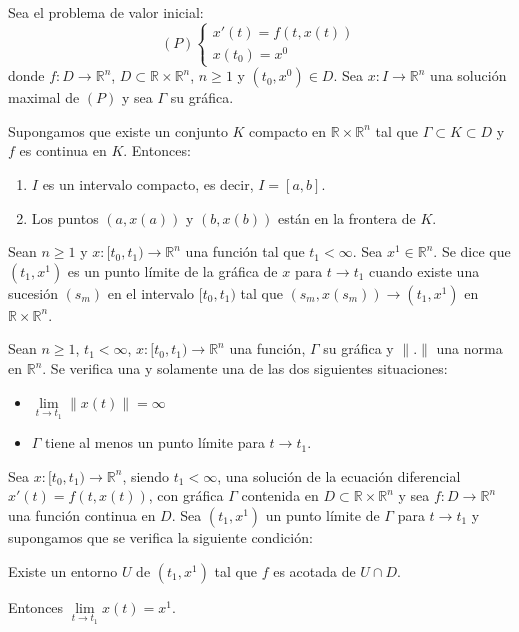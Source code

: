 \begin{theorem}
    Sea el problema de valor inicial:
    $$(P) \begin{cases}
            x'(t) = f(t, x(t)) \\
            x(t_0) = x^0
        \end{cases}$$
    donde $f: D \to \mathbb{R}^n$, $D \subset \mathbb{R} \times \mathbb{R}^n$, $n \geq 1$ y $(t_0, x^0) \in D$.
    Sea $x: I \to \mathbb{R}^n$ una solución maximal de $(P)$ y sea $\Gamma$ su gráfica.

    Supongamos que existe un conjunto $K$ compacto en $\mathbb{R} \times \mathbb{R}^n$ tal que $\Gamma \subset K \subset D$ y $f$ es continua en $K$.
    Entonces:
    \begin{enumerate}
        \item $I$ es un intervalo compacto, es decir, $I = [a, b]$.
        \item Los puntos $(a, x(a))$ y $(b, x(b))$ están en la frontera de $K$.
    \end{enumerate}
\end{theorem}

\begin{definition}
    Sean $n \geq 1$ y $x: [t_0, t_1) \to \mathbb{R}^n$ una función tal que $t_1 < \infty$.
    Sea $x^1 \in \mathbb{R}^n$.
    Se dice que $(t_1, x^1)$ es un punto límite de la gráfica de $x$ para $t \to t_1$ cuando existe una sucesión $(s_m)$ en el intervalo $[t_0, t_1)$ tal que $(s_m, x(s_m)) \to (t_1, x^1)$ en $\mathbb{R} \times \mathbb{R}^n$.
\end{definition}

\begin{proposition}
    Sean $n \geq 1$, $t_1 < \infty$, $x: [t_0, t_1) \to \mathbb{R}^n$ una función, $\Gamma$ su gráfica y $\|.\|$ una norma en $\mathbb{R}^n$.
    Se verifica una y solamente una de las dos siguientes situaciones:
    \begin{itemize}
        \item $\lim\limits_{t \to t_1} \|x(t)\| = \infty$
        \item $\Gamma$ tiene al menos un punto límite para $t \to t_1$.
    \end{itemize}
\end{proposition}

\begin{theorem}
    Sea $x: [t_0, t_1) \to \mathbb{R}^n$, siendo $t_1 < \infty$, una solución de la ecuación diferencial $x'(t) = f(t, x(t))$, con gráfica $\Gamma$ contenida en $D \subset \mathbb{R} \times \mathbb{R}^n$ y sea $f: D \to \mathbb{R}^n$ una función continua en $D$.
    Sea $(t_1, x^1)$ un punto límite de $\Gamma$ para $t \to t_1$ y supongamos que se verifica la siguiente condición:
    \begin{center}
        Existe un entorno $U$ de $(t_1, x^1)$ tal que $f$ es acotada de $U \cap D$.
    \end{center}

    Entonces $\lim\limits_{t \to t_1} x(t) = x^1$.
\end{theorem}

